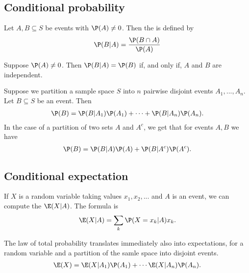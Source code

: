 \documentclass{article}
\begin{document}
\subsection{Conditional probability}
\begin{definition}
    Let $A,B\subseteq S$ be events with $\P(A)\not=0$. Then the 
     is defined by
    \begin{align*}
        \P(B|A) = \frac{\P(B\cap A)}{\P(A)}
    \end{align*}
\end{definition}
\begin{theorem}
    Suppose $\P(A)\not= 0$. Then $\P(B|A)=\P(B)$ if, and only if, $A$ and $B$ are independent.
\end{theorem}
\begin{theorem}
    Suppose we partition a sample space $S$ into $n$ pairwise disjoint events $A_1, ..., A_n$.
    Let $B\subseteq S$ be an event. Then
    \begin{align*}
        \P(B)=\P(B|A_1)\P(A_1)+ \cdots + \P(B|A_n)\P(A_n).
    \end{align*} 
    In the case of a partition of two sets $A$ and $A^c$, we get that for events $A,B$ we have
    \begin{align*}
        \P(B) = \P(B|A)\P(A)+\P(B|A^c)\P(A^c).
    \end{align*}
\end{theorem}
\subsection{Conditional expectation}
\begin{definition}
    If $X$ is a random variable taking values $x_1, x_2, ...$ and $A$ is an event, we can
    compute the  $\E(X|A)$. The formula is
    \begin{align*}
        \E(X|A) = \sum_k \P(X=x_k|A)x_k.
    \end{align*}
\end{definition}
\begin{proposition}
    The law of total probability translates immediately also into expectations, for a random
    variable and a partition of the samle space into disjoint events.
    \begin{align*}
        \E(X) = \E(X|A_1)\P(A_1)+\cdots\E(X|A_n)\P(A_n).
    \end{align*} 
\end{proposition}
\end{document}
